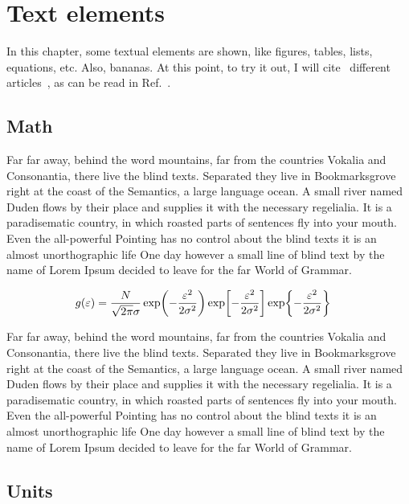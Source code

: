 \chapter{Text elements}
\label{cha:text-elements}

In this chapter, some textual elements are shown, like figures, tables,
lists, equations, etc. Also, bananas. At this point, to try it out, I will
cite~\cite{a} different articles~\cite{a,b,c}, as can be read in Ref.~\cite{b}.

\section{Math}
\label{sec:math}

Far far away, behind the word mountains, far from the countries Vokalia and
Consonantia, there live the blind texts. Separated they live in
Bookmarksgrove right at the coast of the Semantics, a large language
ocean. A small river named Duden flows by their place and supplies it with
the necessary regelialia. It is a paradisematic country, in which roasted
parts of sentences fly into your mouth. Even the all-powerful Pointing has
no control about the blind texts it is an almost unorthographic life One
day however a small line of blind text by the name of Lorem Ipsum decided
to leave for the far World of Grammar.

\begin{align}
    g(\varepsilon) &= \frac{N}{\sqrt{2\pi} \sigma}
    \exp\!\left(-\frac{\varepsilon^2}{2\sigma^2}\right)
    \exp\!\left[-\frac{\varepsilon^2}{2\sigma^2}\right]
    \exp\!\left\{-\frac{\varepsilon^2}{2\sigma^2}\right\} 
    \label{eq:gaussian}
\end{align}

Far far away, behind the word mountains, far from the countries Vokalia and
Consonantia, there live the blind texts. Separated they live in
Bookmarksgrove right at the coast of the Semantics, a large language
ocean. A small river named Duden flows by their place and supplies it with
the necessary regelialia. It is a paradisematic country, in which roasted
parts of sentences fly into your mouth. Even the all-powerful Pointing has
no control about the blind texts it is an almost unorthographic life One
day however a small line of blind text by the name of Lorem Ipsum decided
to leave for the far World of Grammar.

\section{Units}
\label{sec:units}

